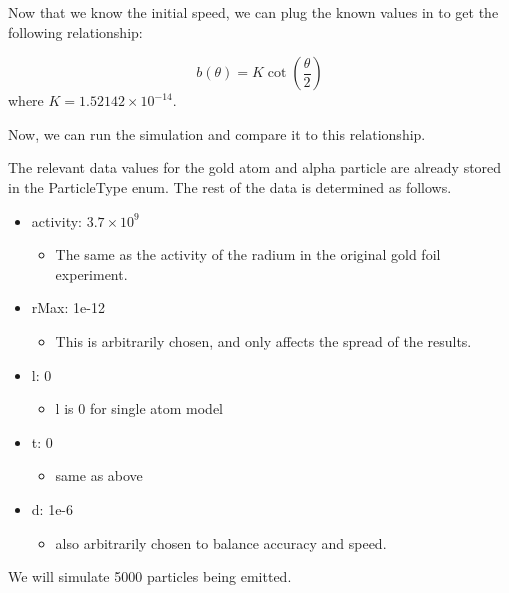 \documentclass[11pt]{article}
\providecommand{\tightlist}{%
      \setlength{\itemsep}{0pt}\setlength{\parskip}{0pt}}
\begin{document}
Now that we know the initial speed, we can plug the known values in to
get the following relationship:

\[ b(\theta) = K\cot(\frac{\theta}{2}) \] where
\(K = 1.52142\times 10^{-14}\).

Now, we can run the simulation and compare it to this relationship.

The relevant data values for the gold atom and alpha particle are
already stored in the ParticleType enum. The rest of the data is
determined as follows.

\begin{itemize}
\tightlist
\item
  activity: \(3.7\times 10^{9}\)

  \begin{itemize}
  \tightlist
  \item
    The same as the activity of the radium in the original gold foil
    experiment.
  \end{itemize}
\item
  rMax: 1e-12

  \begin{itemize}
  \tightlist
  \item
    This is arbitrarily chosen, and only affects the spread of the
    results.
  \end{itemize}
\item
  l: 0

  \begin{itemize}
  \tightlist
  \item
    l is 0 for single atom model
  \end{itemize}
\item
  t: 0

  \begin{itemize}
  \tightlist
  \item
    same as above
  \end{itemize}
\item
  d: 1e-6

  \begin{itemize}
  \tightlist
  \item
    also arbitrarily chosen to balance accuracy and speed.
  \end{itemize}
\end{itemize}

We will simulate 5000 particles being emitted.
\end{document}
